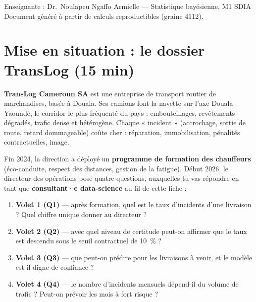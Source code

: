 \documentclass[11pt,a4paper]{article}
\begin{document}
\begin{titlepage}
\vfill
{\small Enseignante : Dr.\ Noulapeu Ngaffo Armielle --- Statistique bayésienne, M1 SDIA}\\
{\small Document généré à partir de calculs reproductibles (graine 4112).}
\end{titlepage}

\tableofcontents
\newpage

\section{Mise en situation : le dossier TransLog (15 min)}

\begin{contexte}[Le dossier]
\textbf{TransLog Cameroun SA} est une entreprise de transport routier de
marchandises, basée à Douala. Ses camions font la navette sur l'axe
Douala--Yaoundé, le corridor le plus fréquenté du pays : embouteillages,
revêtements dégradés, trafic dense et hétérogène. Chaque « incident »
(accrochage, sortie de route, retard dommageable) coûte cher : réparation,
immobilisation, pénalités contractuelles, image.

Fin 2024, la direction a déployé un \textbf{programme de formation des
chauffeurs} (éco-conduite, respect des distances, gestion de la fatigue).
Début 2026, le directeur des opérations pose quatre questions, auxquelles
tu vas répondre en tant que \textbf{consultant·e data-science} au fil de
cette fiche :
\begin{enumerate}[leftmargin=5mm, itemsep=1mm]
  \item \textbf{Volet 1 (Q1)} --- après formation, quel est le taux d'incidents
        d'une livraison ? Quel chiffre unique donner au directeur ?
  \item \textbf{Volet 2 (Q2)} --- avec quel niveau de certitude peut-on affirmer
        que le taux est descendu sous le seuil contractuel de 10~\% ?
  \item \textbf{Volet 3 (Q3)} --- que peut-on prédire pour les livraisons
        à venir, et le modèle est-il digne de confiance ?
  \item \textbf{Volet 4 (Q4)} --- le nombre d'incidents mensuels dépend-il du
        volume de trafic ? Peut-on prévoir les mois à fort risque ?
\end{enumerate}
\end{contexte}
\end{document}
